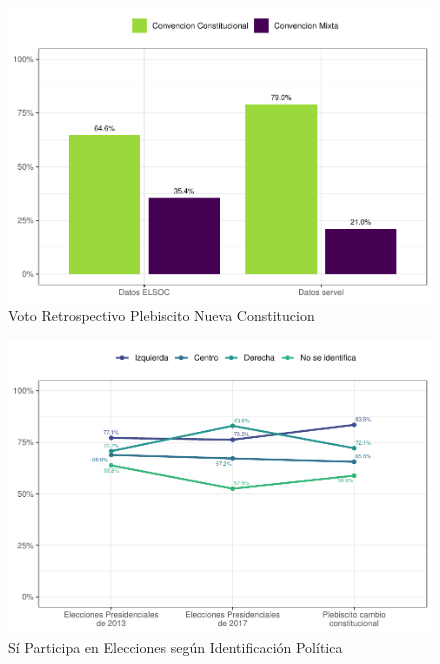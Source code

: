 \documentclass[
  12pt,
  openany]{book}
\begin{document}
\begin{figure}

{\centering \includegraphics{reporte-elsoc_files/figure-latex/servel-cc-1} 

}

\caption{Voto Retrospectivo Plebiscito Nueva Constitucion}\label{fig:servel-cc}
\end{figure}

\begin{figure}

{\centering \includegraphics{reporte-elsoc_files/figure-latex/particip-elect-id-1} 

}

\caption{Sí Participa en Elecciones según Identificación Política}\label{fig:particip-elect-id}
\end{figure}
\end{document}
